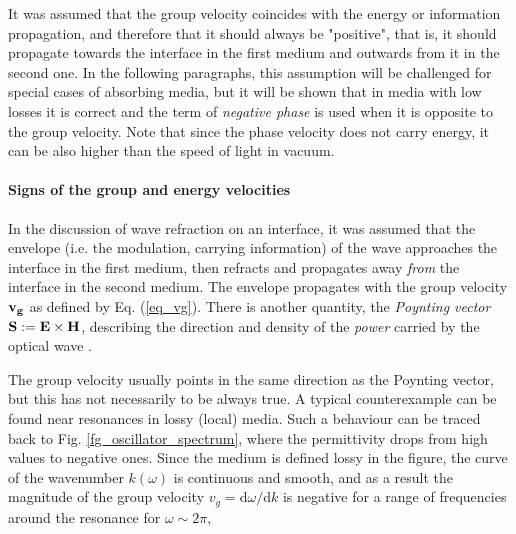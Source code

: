 It was assumed that the group velocity coincides with the energy or information propagation, and therefore that it should always be "positive", that is, it should propagate towards the interface in the first medium and outwards from it in the second one. In the following paragraphs, this assumption will be challenged for special cases of absorbing media, but it will be shown that in media with low losses it is correct and the term of \textit{negative phase}  is used when it is opposite to the group velocity.
Note that since the phase velocity does not carry energy, it can be also higher than the speed of light in vacuum.

\paragraph{Signs of the group and energy velocities}   %
In the discussion of wave refraction on an interface, it was assumed that the envelope (i.e. the modulation, carrying information) of the wave approaches the interface in the first medium, then refracts and propagates away \textit{from} the interface in the second medium. The envelope propagates with the group velocity ${\mathbf{v_g}}$ as defined by Eq. (\ref{eq_vg}). There is another quantity, the \textit{Poynting vector} $\mathbf{S} := \mathbf{E}\times\mathbf{H}$, describing the direction and density of the \textit{power} carried by the optical wave \cite[p. 16]{klingshirn2007semiconductor}. 

The group velocity usually points in the same direction as the Poynting vector, but this has not necessarily to be always true. A typical counterexample can be found near resonances in lossy (local) media. Such a behaviour can be traced back to Fig. \ref{fg_oscillator_spectrum}, where the permittivity drops from high values to negative ones. Since the medium is defined lossy in the figure, the curve of the wavenumber $k(\omega)$ is continuous and smooth, and as a result the magnitude of the group velocity $v_g = \mathrm{d}\omega / \mathrm{d}k$ is negative for a range of frequencies around the resonance for $\omega \sim 2\pi$, %

